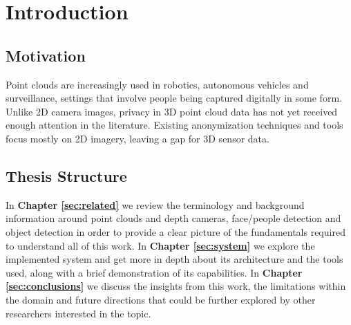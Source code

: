 %
\chapter{Introduction}
\label{sec:intro}


\section{Motivation}
\label{sec:intro:motivation}
Point clouds are increasingly used in robotics, autonomous vehicles and surveillance, settings that involve people being captured digitally in some form.
Unlike 2D camera images, privacy in 3D point cloud data has not yet received enough attention in the literature.
Existing anonymization techniques and tools focus mostly on 2D imagery, leaving a gap for 3D sensor data.
\section{Thesis Structure}
\label{sec:intro:structure}

In \textbf{Chapter \ref{sec:related}}
we review the terminology and background information around point clouds and depth cameras, face/people detection and object detection
in order to provide a clear picture of the fundamentals required to understand all of this work.
In \textbf{Chapter \ref{sec:system}} we explore the implemented system and get more in depth about its architecture and the tools used,
along with a brief demonstration of its capabilities.
In \textbf{Chapter \ref{sec:conclusions}}
we discuss the insights from this work, the limitations within the domain and future directions
that could be further explored by other researchers interested in the topic.



